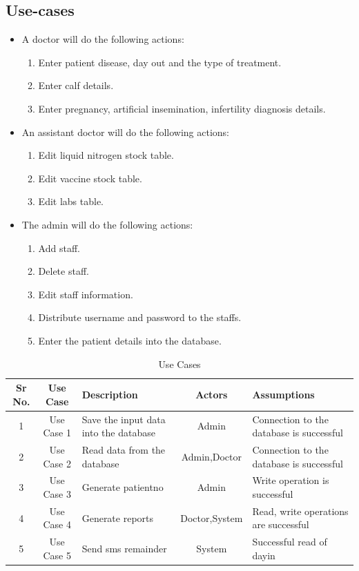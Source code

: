 \documentclass[oneside,a4paper,12pt]{book}
\begin{document}
\subsection{Use-cases}
\begin{itemize}
\item A doctor will do the following actions:
\begin{enumerate}
\item Enter patient disease, day out and the type of treatment.
\item Enter calf details.
\item Enter pregnancy, artificial insemination, infertility diagnosis details.
\end{enumerate}



\item An assistant doctor will do the following actions:
\begin{enumerate}[1.]
\item Edit liquid nitrogen stock table.
\item Edit vaccine stock table.
\item Edit labs table.
\end{enumerate}

\item The admin will do the following actions:
\begin{enumerate}[1.]
\item Add staff.
\item Delete staff.
\item Edit staff information.
\item Distribute username and password to the staffs.
\item Enter the patient details into the database.


\end{enumerate}
\end{itemize}


\begin{table}[!htbp]
\begin{center}
\def\arraystretch{1.5}
\begin{tabularx}{\textwidth}{| c | c | X | c | X |}
\hline
Sr No.	& Use Case	& Description	& Actors	& Assumptions \\
\hline
1& Use Case 1 & Save the input data into the database & Admin & Connection to the database is successful \\
\hline
2& Use Case 2 & Read data from the database & Admin,Doctor & Connection to the database is successful \\
\hline
3& Use Case 3 & Generate patientno & Admin & Write operation is successful \\
\hline
4& Use Case 4 & Generate reports & Doctor,System & Read, write operations are successful \\
\hline
5& Use Case 5 & Send sms remainder & System & Successful read of dayin \\
\hline
\end{tabularx}
\end{center}
\caption{Use Cases}
\label{tab:usecase}
\end{table}
\end{document}
